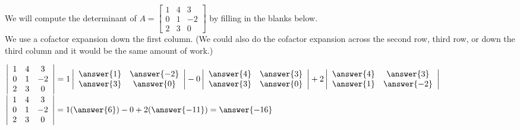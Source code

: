 \documentclass{ximera}
\begin{document}
    	 \begin{question} We will compute the determinant of $A = \begin{bmatrix} 1& 4&3 \\ 0 &1 &-2 \\ 2&3& 0\end{bmatrix}$ by filling in the blanks below. \\
    	 	
    	 	We use a cofactor expansion down the first column. (We could also do the cofactor expansion across the second row, third row, or down the third column and it would be the same amount of work.)
    	 	
    	 $\left|\begin{array}{ccc} 1&4 &3 \\ 0 &1 &-2 \\ 2&3& 0\end{array}\right| = 1\left|\begin{array}{ccc} \answer{1}&  \answer{-2}\\  \answer{3} & \answer{0}  \end{array}\right| 
    	 -0\left|\begin{array}{ccc} \answer{4}&  \answer{3}\\  \answer{3} & \answer{0}  \end{array}\right| 
    	  +2\left|\begin{array}{ccc} \answer{4}&  \answer{3}\\  \answer{1} & \answer{-2}  \end{array}\right| $	\vspace{10pt}\\
    	  $\left|\begin{array}{ccc} 1&4 &3 \\ 0 &1 &-2 \\ 2&3& 0\end{array}\right| = 1(\answer{6}) -0 + 2(\answer{-11}) =\answer{-16}$
    	 	
    	 	
    	 \end{question}	
    	 
\end{document}
